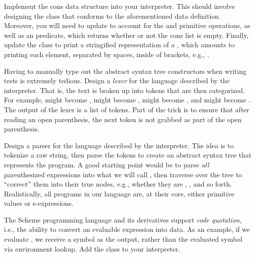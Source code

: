 Implement the cons data structure into your interpreter. This should involve designing the  class that conforms to the aforementioned data definition. Moreover, you will need to update  to account for the  and  primitive operations, as well as an  predicate, which returns whether or not the cons list is empty. Finally, update the  class to print a stringified representation of a , which amounts to printing each element, separated by spaces, inside of brackets, e.g., \ttt{[$l_0, l_1, ..., l_{n-1}]$}.

Having to manually type out the abstract syntax tree constructors when writing tests is extremely tedious. Design a \emph{lexer} for the language described by the interpreter. That is, the text is broken up into tokens that are then categorized. For example,  might become ,  might become ,  might become , and  might become . The output of the lexer is a list of tokens. Part of the trick is to ensure that after reading an open parenthesis, the next token is not grabbed as part of the open parenthesis.

Design a parser for the language described by the interpreter. The idea is to tokenize a raw string, then parse the tokens to create an abstract syntax tree that represents the program. A good starting point would be to parse \emph{all} parenthesized expressions into what we will call , then traverse over the tree to ``correct'' them into their true nodes, e.g., whether they are , , and so forth. Realistically, all programs in our language are, at their core, either primitive values or s-expressions.

The Scheme programming language and its derivatives support \emph{code quotation}, i.e., the ability to convert an evaluable expression into data. As an example, if we evaluate , we receive a symbol as the output, rather than the evaluated symbol via environment lookup. Add the  class to your interpreter.


